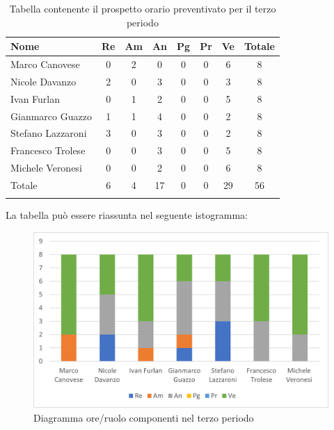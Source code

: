 \begin{longtable}{|l|c|c|c|c|c|c|c|}
	\hline
	\rowcolor{lighter-grayer}
	\textbf{Nome}     & \textbf{Re} & \textbf{Am} & \textbf{An} & \textbf{Pg} & \textbf{Pr} & \textbf{Ve} & \textbf{Totale} \\
	\hline
	\endfirsthead

	\hline
	Marco Canovese    & 0           & 2           & 0           & 0           & 0           & 6           & 8               \\
	\hline
	\hline
	Nicole Davanzo    & 2           & 0           & 3           & 0           & 0           & 3           & 8               \\
	\hline
	\hline
	Ivan Furlan       & 0           & 1           & 2           & 0           & 0           & 5           & 8               \\
	\hline
	\hline
	Gianmarco Guazzo  & 1           & 1           & 4           & 0           & 0           & 2           & 8               \\
	\hline
	\hline
	Stefano Lazzaroni & 3           & 0           & 3           & 0           & 0           & 2           & 8               \\
	\hline
	\hline
	Francesco Trolese & 0           & 0           & 3           & 0           & 0           & 5           & 8               \\
	\hline
	\hline
	Michele Veronesi  & 0           & 0           & 2           & 0           & 0           & 6           & 8               \\
	\hline
	\hline
	Totale            & 6           & 4           & 17          & 0           & 0           & 29          & 56              \\
	\hline
	\rowcolor{white}
	\caption{Tabella contenente il prospetto orario preventivato per il terzo periodo}
\end{longtable}


La tabella può essere riassunta nel seguente istogramma:

\begin{figure}[H]
	\centering
	\includegraphics[width=0.8\linewidth]{res/images/preventivo/dettaglio_analisi/3-1.png}
	\caption{Diagramma ore/ruolo componenti nel terzo periodo}
	\label{fig:diagramma suddivisione ruoli terzo periodo analisi}
\end{figure}

